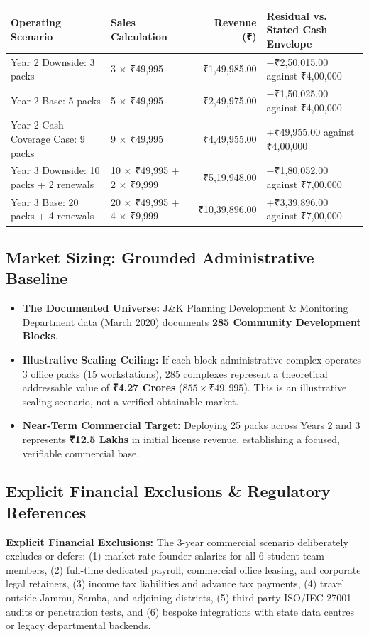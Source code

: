 \documentclass[11pt,a4paper]{article}
\begin{document}
\noindent
\begin{tabularx}{\textwidth}{|l|l|r|Y|}
\hline
\textbf{Operating Scenario} & \textbf{Sales Calculation} & \textbf{Revenue (₹)} & \textbf{Residual vs. Stated Cash Envelope} \\
\hline
Year 2 Downside: 3 packs & 3 $\times$ ₹49,995 & ₹1,49,985.00 & −₹2,50,015.00 against ₹4,00,000 \\
Year 2 Base: 5 packs & 5 $\times$ ₹49,995 & ₹2,49,975.00 & −₹1,50,025.00 against ₹4,00,000 \\
Year 2 Cash-Coverage Case: 9 packs & 9 $\times$ ₹49,995 & ₹4,49,955.00 & +₹49,955.00 against ₹4,00,000 \\
Year 3 Downside: 10 packs + 2 renewals & 10 $\times$ ₹49,995 + 2 $\times$ ₹9,999 & ₹5,19,948.00 & −₹1,80,052.00 against ₹7,00,000 \\
Year 3 Base: 20 packs + 4 renewals & 20 $\times$ ₹49,995 + 4 $\times$ ₹9,999 & ₹10,39,896.00 & +₹3,39,896.00 against ₹7,00,000 \\
\hline
\end{tabularx}

\vspace{0.15cm}
\subsection{Market Sizing: Grounded Administrative Baseline}
\begin{itemize}[noitemsep,topsep=0pt]
    \item \textbf{The Documented Universe:} J\&K Planning Development \& Monitoring Department data (March 2020) documents \textbf{285 Community Development Blocks}.
    \item \textbf{Illustrative Scaling Ceiling:} If each block administrative complex operates 3 office packs (15 workstations), 285 complexes represent a theoretical addressable value of \textbf{₹4.27 Crores} ($855 \times ₹49,995$). This is an illustrative scaling scenario, not a verified obtainable market.
    \item \textbf{Near-Term Commercial Target:} Deploying 25 packs across Years 2 and 3 represents \textbf{₹12.5 Lakhs} in initial license revenue, establishing a focused, verifiable commercial base.
\end{itemize}

\vspace{0.15cm}
\subsection{Explicit Financial Exclusions \& Regulatory References}
\noindent\textbf{Explicit Financial Exclusions:} The 3-year commercial scenario deliberately excludes or defers: (1) market-rate founder salaries for all 6 student team members, (2) full-time dedicated payroll, commercial office leasing, and corporate legal retainers, (3) income tax liabilities and advance tax payments, (4) travel outside Jammu, Samba, and adjoining districts, (5) third-party ISO/IEC 27001 audits or penetration tests, and (6) bespoke integrations with state data centres or legacy departmental backends.
\end{document}
